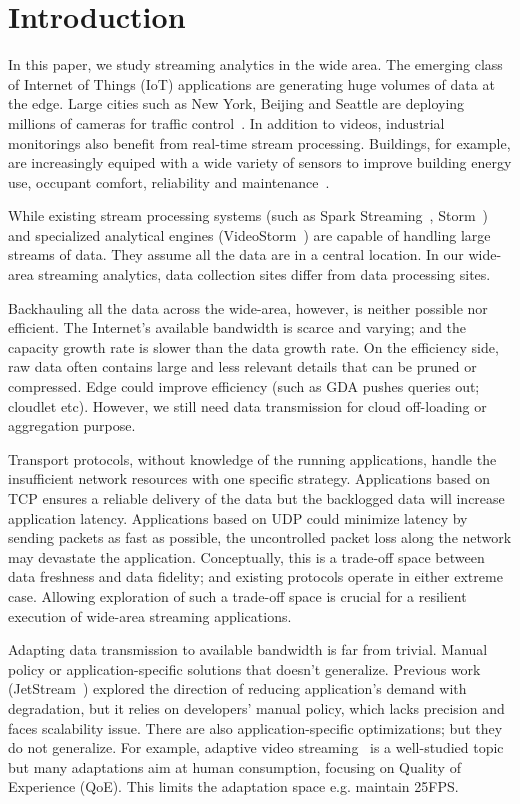 \section{Introduction}

In this paper, we study streaming analytics in the wide area. The emerging class
of Internet of Things (IoT) applications are generating huge volumes of data at
the edge. Large cities such as New York, Beijing and Seattle are deploying
millions of cameras for traffic control~\cite{london.surveillance,skynet}. In
addition to videos, industrial monitorings also benefit from real-time stream
processing. Buildings, for example, are increasingly equiped with a wide variety
of sensors to improve building energy use, occupant comfort, reliability and
maintenance~\cite{krioukov2012building}.

While existing stream processing systems (such as Spark
Streaming~\cite{zaharia2013discretized}, Storm~\cite{toshniwal2014storm}) and
specialized analytical engines (VideoStorm~\cite{zhang2017live}) are capable of
handling large streams of data. They assume all the data are in a central
location. In our wide-area streaming analytics, data collection sites differ
from data processing sites.

Backhauling all the data across the wide-area, however, is neither possible nor
efficient. The Internet's available bandwidth is scarce and varying; and the
capacity growth rate is slower than the data growth rate. On the efficiency
side, raw data often contains large and less relevant details that can be pruned
or compressed. Edge could improve efficiency (such as GDA pushes queries out;
cloudlet etc). However, we still need data transmission for cloud off-loading or
aggregation purpose.

Transport protocols, without knowledge of the running applications, handle the
insufficient network resources with one specific strategy. Applications based on
TCP ensures a reliable delivery of the data but the backlogged data will
increase application latency. Applications based on UDP could minimize latency
by sending packets as fast as possible, the uncontrolled packet loss along the
network may devastate the application. Conceptually, this is a trade-off space
between data freshness and data fidelity; and existing protocols operate in
either extreme case. Allowing exploration of such a trade-off space is crucial
for a resilient execution of wide-area streaming applications.

Adapting data transmission to available bandwidth is far from trivial. Manual
policy or application-specific solutions that doesn't generalize. Previous work
(JetStream~\cite{rabkin2014aggregation}) explored the direction of reducing
application's demand with degradation, but it relies on developers' manual
policy, which lacks precision and faces scalability issue.  There are also
application-specific optimizations; but they do not generalize. For example,
adaptive video streaming~\cite{yin2015control} is a well-studied topic but many
adaptations aim at human consumption, focusing on Quality of Experience
(QoE). This limits the adaptation space e.g. maintain 25FPS.

